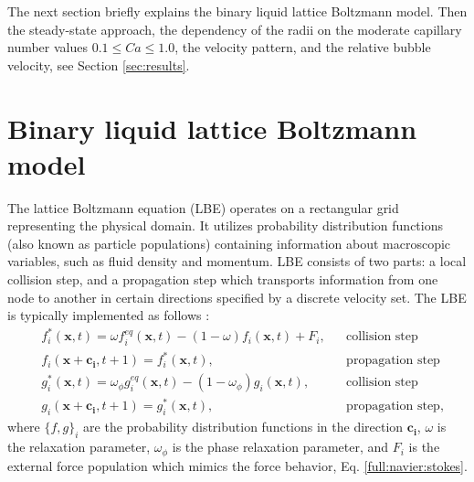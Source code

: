 \documentclass{article}
\begin{document}

The next section briefly explains the binary liquid lattice Boltzmann model. Then
the steady-state approach, the dependency of the radii on the moderate capillary number values
$0.1\leq Ca \leq 1.0$, the velocity pattern, and the relative bubble velocity, see Section
\ref{sec:results}. 

\section{Binary liquid lattice Boltzmann model}
The lattice Boltzmann equation (LBE) operates on a rectangular grid representing the
physical domain. It utilizes
probability distribution functions (also known as particle populations)
containing information about
macroscopic variables, such as fluid density and momentum. LBE consists of
two parts: a local collision step, and a propagation step which transports
information from one node to another in certain
directions specified by a discrete velocity set.
The LBE is typically implemented as follows \cite{ginzburg-boundary-main}:
\begin{equation}
\label{standard:implementation}
\begin{aligned}
&f_i^{*}(\bm{x},t)=\omega f_i^{eq}(\bm{x},t)-(1-\omega) f_i(\bm{x},t) +
F_i,&&\text{collision step}\\
&f_i(\bm{x}+\bm{c_i},t+1)=f_i^{*}(\bm{x},t),&&\text{propagation step}\\
&g_i^{*}(\bm{x},t)=\omega_{\phi} g_i^{eq}(\bm{x},t)-(1-\omega_{\phi})
g_i(\bm{x},t),&&\text{collision step}\\
&g_i(\bm{x}+\bm{c_i},t+1)=g_i^{*}(\bm{x},t),&&\text{propagation step},
\end{aligned}
\end{equation}
where $\{f,g\}_i$ are the probability distribution functions in the direction $\bm{c_i}$, $\omega$
is the
relaxation parameter, $\omega_{\phi}$ is the phase relaxation parameter, and $F_i$ is the external
force population which
mimics the force behavior, Eq. \ref{full:navier:stokes}.
\end{document}
